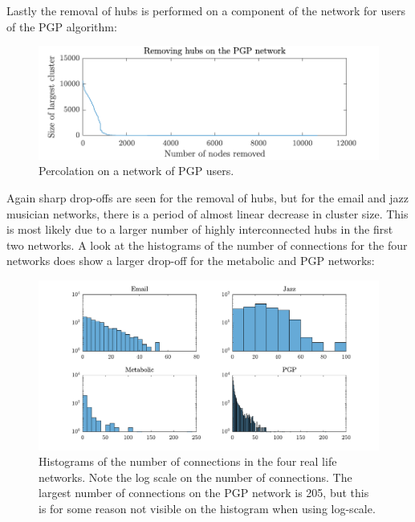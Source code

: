 \documentclass[a4paper,10pt]{article} 	%
\numberwithin{equation}{section}
\begin{document}
	Lastly the removal of hubs is performed on a component of the network for users of the PGP algorithm:
	\begin{figure}[H]
		\centering
		\includegraphics[width=0.7\linewidth]{NetworkPGP}
		\caption{Percolation on a network of PGP users.}
		\label{fig:networkPGP}
	\end{figure}
	Again sharp drop-offs are seen for the removal of hubs, but for the email and jazz musician networks, there is a period of almost linear decrease in cluster size. This is most likely due to a larger number of highly interconnected hubs in the first two networks. A look at the histograms of the number of connections for the four networks does show a larger drop-off for the metabolic and PGP networks:
	\begin{figure}[H]
		\centering
		\includegraphics[width=0.7\linewidth]{Hists}
		\caption{Histograms of the number of connections in the four real life networks. Note the log scale on the number of connections. The largest number of connections on the PGP network is 205, but this is for some reason not visible on the histogram when using log-scale.}
		\label{fig:Hists}
	\end{figure}
 
	
\end{document}
